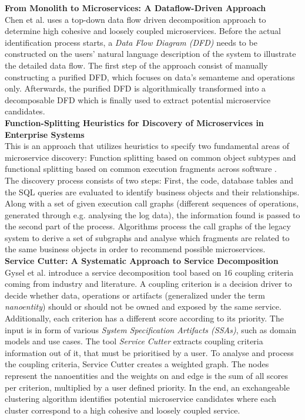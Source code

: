 \noindent
\textbf{From Monolith to Microservices: A Dataflow-Driven Approach } \\
Chen et al. \cite{DataflowDrivenChen} uses a top-down data flow driven decomposition approach to determine high cohesive and loosely coupled microservices. Before the actual identification process starts, a \textit{Data Flow Diagram (DFD)} needs to be constructed on the users' natural language description of the system to illustrate the detailed data flow. The first step of the approach consist of manually constructing a purified DFD, which focuses on data's semanteme and operations only. Afterwards, the purified DFD is algorithmically transformed into a decomposable DFD which is finally used to extract potential microservice candidates. \\


\noindent
\textbf{Function-Splitting Heuristics for Discovery of Microservices in Enterprise Systems  } \\
This is an approach that utilizes heuristics to specify two fundamental areas of microservice discovery: Function splitting based on common object subtypes and functional splitting based on common execution fragments across software \cite{HeuristicsAlwis}. \\
The discovery process consists of two steps: First, the code, database tables and the SQL queries are evaluated to identify business objects and their relationships. Along with a set of given execution call graphs (different sequences of operations, generated through e.g. analysing the log data), the information found is passed to the second part of the process. Algorithms process the call graphs of the legacy system to derive a set of subgraphs and analyse which fragments are related to the same business objects in order to recommend possible microservices. \\

\noindent
\textbf{Service Cutter: A Systematic Approach to Service Decomposition  } \\
Gysel et al. \cite{ServiceCutter} introduce a service decomposition tool based on 16 coupling criteria coming from industry and literature. A coupling criterion is a decision driver to decide whether data, operations or artifacts (generalized under the term \textit{nanoentity}) should or should not be owned and exposed by the same service. Additionally, each criterion has a different score according to its priority.
The input is in form of various \textit{System Specification Artifacts (SSAs)}, such as domain models and use cases.  The tool \textit{Service Cutter} extracts coupling criteria information out of it, that must be prioritised by a user. To analyse and process the coupling criteria, Service Cutter creates a weighted graph. The nodes represent the nanoentities and the weights on and edge is the sum of all scores per criterion, multiplied by a user defined priority. In the end, an exchangeable clustering algorithm identifies potential microservice candidates where each cluster correspond to a high cohesive and loosely coupled service.
 
